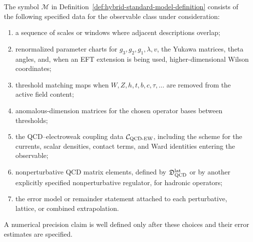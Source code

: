 \begin{definition}
\label{def:sm-hybrid-matching-data}
The symbol \(\mathcal M\) in
Definition~\ref{def:hybrid-standard-model-definition} consists of the following
specified data for the observable class under consideration:
\begin{enumerate}
\item a sequence of scales or windows where adjacent descriptions overlap;
\item renormalized parameter charts for \(g_3,g_2,g_1,\lambda,v\), the
      Yukawa matrices, theta angles, and, when an EFT extension is being used,
      higher-dimensional Wilson coordinates;
\item threshold matching maps when \(W,Z,h,t,b,c,\tau,\ldots\) are removed
      from the active field content;
\item anomalous-dimension matrices for the chosen operator bases between
      thresholds;
\item the QCD--electroweak coupling data
      \(\mathcal C_{\rm QCD\text{-}EW}\), including the scheme for the
      currents, scalar densities, contact terms, and Ward identities entering
      the observable;
\item nonperturbative QCD matrix elements, defined by
      \(\mathfrak D_{\rm QCD}^{\rm lat}\) or by another explicitly specified
      nonperturbative regulator, for hadronic operators;
\item the error model or remainder statement attached to each perturbative,
      lattice, or combined extrapolation.
\end{enumerate}
A numerical precision claim is well defined only after these choices and
their error estimates are specified.
\end{definition}

